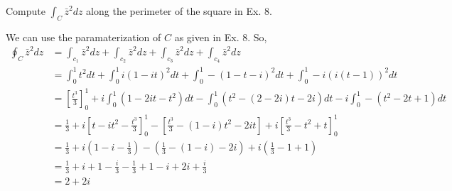 \documentclass[12pt]{article}
\newenvironment{exercise}[2][Exercise]{\begin{trivlist}
\item[\hskip \labelsep {\bfseries #1} \hskip \labelsep {\bfseries #2.}]}{\end{trivlist}}
\begin{document}
\begin{exercise}{10}
	Compute $\int_{C} \bar{z}^2 dz$ along the perimeter of the square in Ex. 8.
\end{exercise}	
We can use the paramaterization of $C$ as given in Ex. 8. So,
\begin{align*}
	\oint_{C}\bar{z}^2 dz &= \int_{c_1} \bar{z}^2 dz + \int_{c_2} \bar{z}^2 dz + \int_{c_3} \bar{z}^2dz + \int_{c_4} \bar{z}^2dz \\
			      &= \int_{0}^{1} t^2 dt + \int_{0}^{1} i(1 - it)^2 dt + \int_{0}^{1} -(1 - t - i)^2 dt + \int_{0}^{1} -i(i(t - 1))^2dt \\
			      &= \left[\frac{t^3}{3}\right]_{0}^{1} + i\int_{0}^{1} (1 -2it -t^2)dt - \int_{0}^{1} (t^2 - (2 - 2i)t - 2i)dt -i\int_{0}^{1} -(t^2 - 2t + 1)dt \\
			      &= \frac{1}{3} + i\left[t - it^2 - \frac{t^3}{3}\right]_{0}^{1} - \left[\frac{t^3}{3} - (1 -i)t^2 - 2it\right] + i\left[\frac{t^3}{3} - t^2 + t\right]_{0}^{1} \\
			      &= \frac{1}{3} + i\left(1 - i - \frac{1}{3}\right) - \left(\frac{1}{3} - (1 - i) - 2i\right) + i\left(\frac{1}{3} - 1 + 1\right) \\
			      &= \frac{1}{3} + i + 1 - \frac{i}{3} - \frac{1}{3} + 1 - i + 2i + \frac{i}{3} \\
			      &= 2 + 2i
\end{align*}
\end{document}
